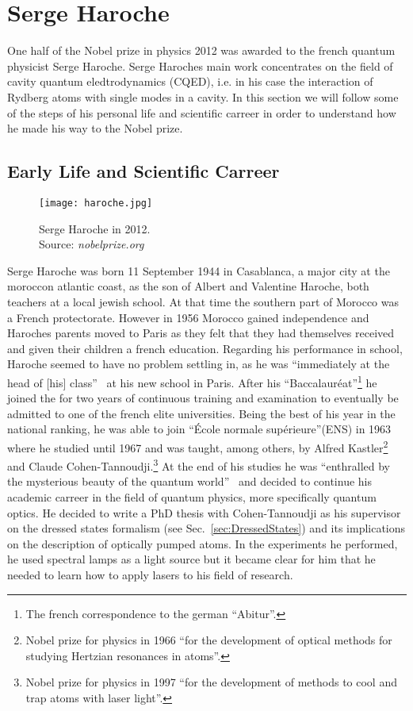 \section{Serge Haroche}
One half of the Nobel prize in physics 2012 was awarded to the french quantum
physicist Serge Haroche. Serge Haroches main work concentrates on the field of
cavity quantum eledtrodynamics (CQED), i.e. in his case the interaction of
Rydberg atoms with single modes in a cavity. In this section we will follow some
of the steps of his personal life and scientific carreer in order to understand how he
made his way to the Nobel prize. 

\subsection{Early Life and Scientific Carreer}
\begin{wrapfigure}{r}{0.33\textwidth}
  \centering
  \texttt{[image: haroche.jpg]}
  \caption{Serge Haroche in 2012.\\ Source: \textit{nobelprize.org}}
\end{wrapfigure}
Serge Haroche was born 11 September 1944 in Casablanca, a major city at the
moroccon atlantic coast, as the son of Albert and
Valentine Haroche, both teachers at a local jewish school. At that time the
southern part of Morocco was a French protectorate. However in 1956 Morocco
gained independence and Haroches parents moved to Paris as they felt that they
had themselves received and given their children a french education. Regarding
his performance in school, Haroche seemed to have no problem settling in, as he
was ``immediately at the head of [his] class''~\cite{shbio} at his new school in
Paris. After his ``Baccalauréat''\footnote{The french correspondence to the german
``Abitur''.} he joined the for two years of continuous training and examination to
eventually be admitted to one of the french elite universities. Being the best
of his year in the national ranking, he was able to join ``École normale
supérieure''(ENS) in 1963 where he studied until 1967 and was taught, among
others, by Alfred Kastler\footnote{Nobel prize for physics in 1966 ``for the
development of optical methods for studying Hertzian resonances in atoms''.} and
Claude Cohen-Tannoudji.\footnote{Nobel prize for physics in 1997 ``for the
development of methods to cool and trap atoms with laser light''.} At the end of
his studies he was ``enthralled by the mysterious beauty of the quantum
world''~\cite{shbio} and decided to continue his academic carreer in the field of
quantum physics, more specifically quantum optics. He decided to write a PhD
thesis with Cohen-Tannoudji as his supervisor on the dressed states
formalism (see
Sec.~\ref{sec:DressedStates}) and its implications on the description of
optically pumped atoms. In the experiments he performed, he used spectral lamps
as a light source but it became clear for him that he needed to learn how to
apply lasers to his field of research.

